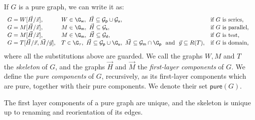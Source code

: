 \begin{definition} If $G$ is a pure graph, we can write it as:
$$
\begin{array}{lll}
G=W[ \vec{H}/\vec{x}], &W\in \G_\mathsf{w},\ \vec{H}\subseteq \mathcal{G}_\mathsf{p}\cup\mathcal{G}_{\mathsf{u}}, &     \text{if $G$ is series,}\\
  G=M[\vec{H}/\vec{x}], &M\in \G_\mathsf{m},\  \vec{H}\subseteq \mathcal{G}_\mathsf{s}, & \text{if $G$ is parallel,}\\
   G=M[\vec{H}/\vec{x}], &M\in \G_\mathsf{m},\  \vec{H}\subseteq\mathcal{G}_{\mathsf{d}},& \text{if $G$ is test,} \\
   G=T[\vec{H}/\vec{x}, \vec{M}/\vec{y}], & T\in \G_\tau,\  \vec{H}\subseteq \mathcal{G}_\mathsf{p}\cup \G_\mathsf{u},\  \vec{M}\subseteq \mathcal{G}_\mathsf{m}\cap \G_{\mathsf{p}}\ \text{ and }\ \vec{y}\subseteq R(T), &  \text{if $G$ is domain,} 
\end{array}
$$
where all the substitutions above are guarded.  We call the graphs  $W, M$ and $T$ the \emph{skeleton} of $G$, and the graphs $\vec{H}$ and $\vec{M}$ the \emph{first-layer components} of $G$.  We define the \emph{pure components}  of $G$,  recursively, as  its first-layer components which are pure, together with their pure components. We denote their set $\mathsf{pure}(G)$.
\end{definition}
The first layer components of a pure graph are unique, and the skeleton is unique up to renaming and reorientation of its edges.   
 
